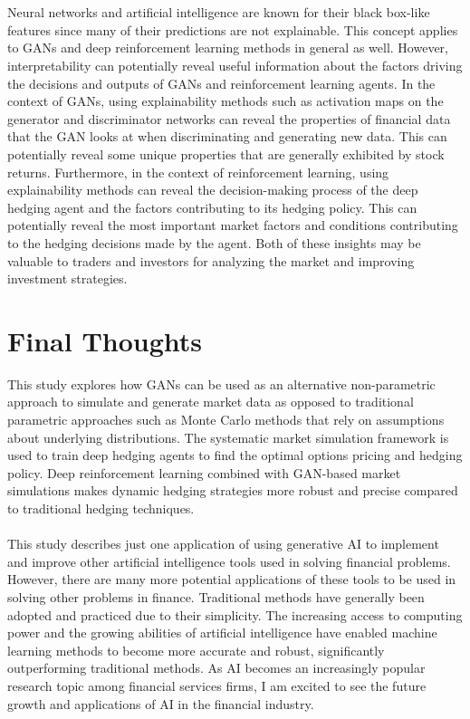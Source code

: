 \\
\\
Neural networks and artificial intelligence are known for their black box-like features since many of their predictions are not explainable. This concept applies to GANs and deep reinforcement learning methods in general as well. However, interpretability can potentially reveal useful information about the factors driving the decisions and outputs of GANs and reinforcement learning agents. In the context of GANs, using explainability methods such as activation maps on the generator and discriminator networks can reveal the properties of financial data that the GAN looks at when discriminating and generating new data. This can potentially reveal some unique properties that are generally exhibited by stock returns. Furthermore, in the context of reinforcement learning, using explainability methods can reveal the decision-making process of the deep hedging agent and the factors contributing to its hedging policy. This can potentially reveal the most important market factors and conditions contributing to the hedging decisions made by the agent. Both of these insights may be valuable to traders and investors for analyzing the market and improving investment strategies.

\section{Final Thoughts}
This study explores how GANs can be used as an alternative non-parametric approach to simulate and generate market data as opposed to traditional parametric approaches such as Monte Carlo methods that rely on assumptions about underlying distributions. The systematic market simulation framework is used to train deep hedging agents to find the optimal options pricing and hedging policy. Deep reinforcement learning combined with GAN-based market simulations makes dynamic hedging strategies more robust and precise compared to traditional hedging techniques. 
\\
\\
This study describes just one application of using generative AI to implement and improve other artificial intelligence tools used in solving financial problems. However, there are many more potential applications of these tools to be used in solving other problems in finance. Traditional methods have generally been adopted and practiced due to their simplicity. The increasing access to computing power and the growing abilities of artificial intelligence have enabled machine learning methods to become more accurate and robust, significantly outperforming traditional methods. As AI becomes an increasingly popular research topic among financial services firms, I am excited to see the future growth and applications of AI in the financial industry.